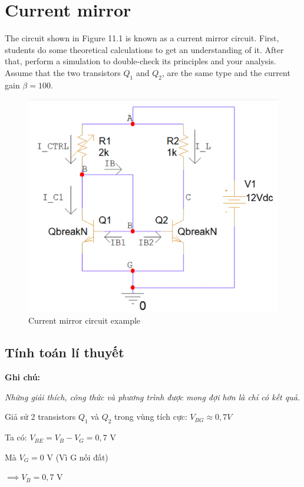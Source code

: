 \section{Current mirror}
The circuit shown in Figure 11.1 is known as a current mirror circuit. First, students do
some theoretical calculations to get an understanding of it. After that, perform a simulation to double-check its principles and your analysis. Assume that the two transistors \(Q_1\)
and \(Q_2\), are the same type and the current gain \(\beta = 100\).

\begin{figure}[ht]
    \centering
    \includegraphics[scale=0.3]{graphics/ex11/f1.png}
    \caption{Current mirror circuit example}
\end{figure}

\subsection{Tính toán lí thuyết}

\textbf{Ghi chú:}

\textit{Những giải thích, công thức và phương trình được mong đợi hơn là chỉ có kết quả.}

Giả sử 2 transistors \(Q_1\) và \(Q_2\) trong vùng tích cực: \(V_{BG} \approx 0,7 V \)

Ta có: \(V_{BE} = V_B - V_G = 0,7\) V

 Mà \(V_G = 0\) V (Vì G nối đất)

 \( \implies V_B = 0,7\) V

